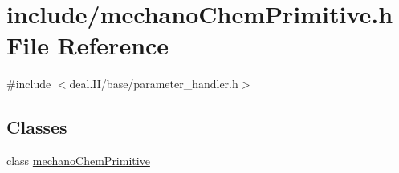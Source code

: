 \section{include/mechano\+Chem\+Primitive.h File Reference}
\label{mechano_chem_primitive_8h}
{\ttfamily \#include $<$deal.\+I\+I/base/parameter\+\_\+handler.\+h$>$}\newline
\subsection*{Classes}
\begin{DoxyCompactItemize}
\item 
class \mbox{\hyperlink{classmechano_chem_primitive}{mechano\+Chem\+Primitive}}
\end{DoxyCompactItemize}
